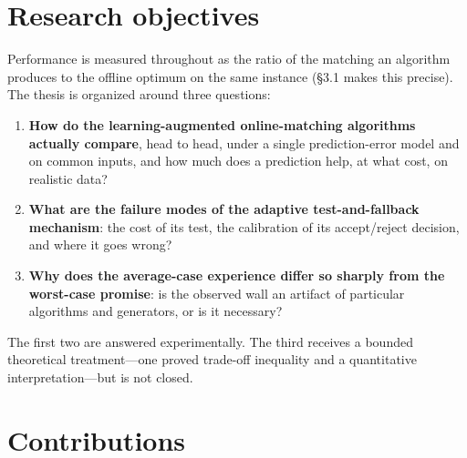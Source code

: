 \section{Research objectives}

Performance is measured throughout as the ratio of the matching an
algorithm produces to the offline optimum on the same instance (§3.1
makes this precise). The thesis is organized around three questions:

\begin{enumerate}
\def\labelenumi{\arabic{enumi}.}
\tightlist
\item
  \textbf{How do the learning-augmented online-matching algorithms
  actually compare}, head to head, under a single prediction-error model
  and on common inputs, and how much does a prediction help, at what
  cost, on realistic data?
\item
  \textbf{What are the failure modes of the adaptive test-and-fallback
  mechanism}: the cost of its test, the calibration of its accept/reject
  decision, and where it goes wrong?
\item
  \textbf{Why does the average-case experience differ so sharply from
  the worst-case promise}: is the observed wall an artifact of
  particular algorithms and generators, or is it necessary?
\end{enumerate}

The first two are answered experimentally. The third receives a bounded
theoretical treatment---one proved trade-off inequality and a
quantitative interpretation---but is not closed.

\section{Contributions}

